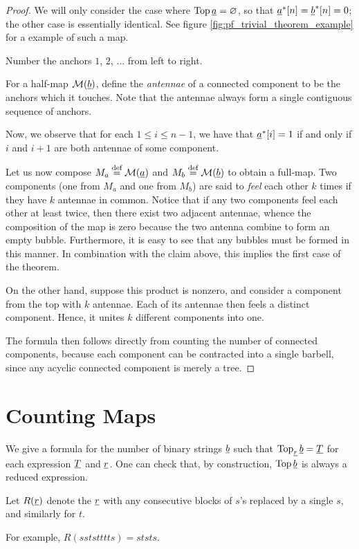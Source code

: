 \begin{proof}
	We will only consider the case where $\operatorname{Top} \underline{a} = \varnothing$, so that $\underline{a}^\ast[n] = \underline{b}^\ast[n] = 0$; the other case is essentially identical.  See figure \ref{fig:pf_trivial_theorem_example} for a example of such a map.

	Number the anchors $1$, $2$, $\dots$ from left to right.

	For a half-map $\mathcal M(\underline{b})$, define the \emph{antennae} of a connected component to be the anchors which it touches.  Note that the antennae always form a single contiguous sequence of anchors.

	Now, we observe that for each $1 \le i \le n-1$, we have that $\underline{a}^\ast[i] = 1$ if and only if $i$ and $i+1$ are both antennae of some component.

	Let us now compose $M_a \stackrel{\text{def}}{=} \mathcal M(\underline{a})$ and $M_b \stackrel{\text{def}}{=} \mathcal M(\underline{b})$ to obtain a full-map.  Two components (one from $M_a$ and one from $M_b$) are said to \emph{feel} each other $k$ times if they have $k$ antennae in common.  Notice that if any two components feel each other at least twice, then there exist two adjacent antennae, whence the composition of the map is zero because the two antenna combine to form an empty bubble.  Furthermore, it is easy to see that any bubbles must be formed in this manner.  In combination with the claim above, this implies the first case of the theorem.

	On the other hand, suppose this product is nonzero, and consider a component from the top with $k$ antennae.  Each of its antennae then feels a distinct component.  Hence, it unites $k$ different components into one.

	The formula then follows directly from counting the number of connected components, because each component can be contracted into a single barbell, since any acyclic connected component is merely a tree.
\end{proof}

\section{Counting Maps}
We give a formula for the number of binary strings $\underline{b}$ such that $\operatorname{Top}_{\underline{r}} \underline{b} = \underline{T}$ for each expression $\underline{T}$ and $\underline{r}$.  One can check that, by construction, $\operatorname{Top} \underline{b}$ is always a reduced expression.

\begin{definition*}
	Let $R(\underline{r})$ denote the $\underline{r}$ with any consecutive blocks of $s$'s replaced by a single $s$, and similarly for $t$.
\end{definition*}
For example, $R(sststttts) = ststs$.

